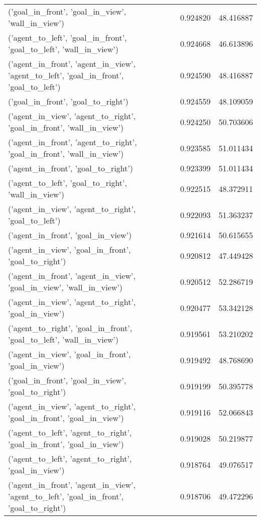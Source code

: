 \begin{tabular}{lrr}
('goal\_in\_front', 'goal\_in\_view', 'wall\_in\_view') & 0.924820 & 48.416887 \\
('agent\_to\_left', 'goal\_in\_front', 'goal\_to\_left', 'wall\_in\_view') & 0.924668 & 46.613896 \\
('agent\_in\_front', 'agent\_in\_view', 'agent\_to\_left', 'goal\_in\_front', 'goal\_to\_left') & 0.924590 & 48.416887 \\
('goal\_in\_front', 'goal\_to\_right') & 0.924559 & 48.109059 \\
('agent\_in\_view', 'agent\_to\_right', 'goal\_in\_front', 'wall\_in\_view') & 0.924250 & 50.703606 \\
('agent\_in\_front', 'agent\_to\_right', 'goal\_in\_front', 'wall\_in\_view') & 0.923585 & 51.011434 \\
('agent\_in\_front', 'goal\_to\_right') & 0.923399 & 51.011434 \\
('agent\_to\_left', 'goal\_to\_right', 'wall\_in\_view') & 0.922515 & 48.372911 \\
('agent\_in\_view', 'agent\_to\_right', 'goal\_to\_left') & 0.922093 & 51.363237 \\
('agent\_in\_front', 'goal\_in\_view') & 0.921614 & 50.615655 \\
('agent\_in\_view', 'goal\_in\_front', 'goal\_to\_right') & 0.920812 & 47.449428 \\
('agent\_in\_front', 'agent\_in\_view', 'goal\_in\_view', 'wall\_in\_view') & 0.920512 & 52.286719 \\
('agent\_in\_view', 'agent\_to\_right', 'goal\_in\_view') & 0.920477 & 53.342128 \\
('agent\_to\_right', 'goal\_in\_front', 'goal\_to\_left', 'wall\_in\_view') & 0.919561 & 53.210202 \\
('agent\_in\_view', 'goal\_in\_front', 'goal\_in\_view') & 0.919492 & 48.768690 \\
('goal\_in\_front', 'goal\_in\_view', 'goal\_to\_right') & 0.919199 & 50.395778 \\
('agent\_in\_view', 'agent\_to\_right', 'goal\_in\_front', 'goal\_in\_view') & 0.919116 & 52.066843 \\
('agent\_to\_left', 'agent\_to\_right', 'goal\_in\_front', 'goal\_in\_view') & 0.919028 & 50.219877 \\
('agent\_to\_left', 'agent\_to\_right', 'goal\_in\_view') & 0.918764 & 49.076517 \\
('agent\_in\_front', 'agent\_in\_view', 'agent\_to\_left', 'goal\_in\_front', 'goal\_to\_right') & 0.918706 & 49.472296 \\

\end{tabular}
